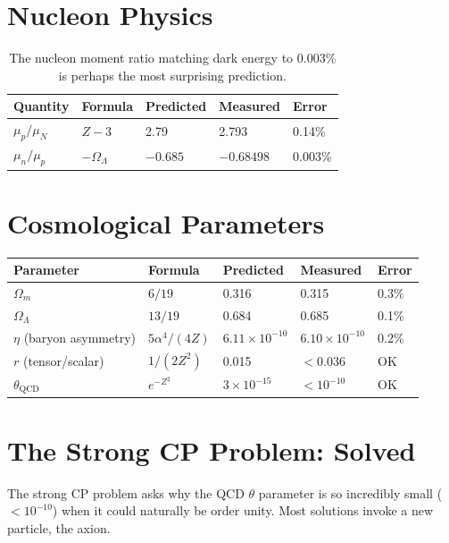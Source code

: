 \documentclass[11pt,a4paper]{article}
\theoremstyle{plain}
\theoremstyle{definition}
\theoremstyle{remark}
\newcommand{\Omegam}{\Omega_m}
\newcommand{\OmegaL}{\Omega_\Lambda}
\begin{document}
\section{Nucleon Physics}

\begin{table}[h!]
\centering
\begin{tabular}{lllll}
\toprule
\textbf{Quantity} & \textbf{Formula} & \textbf{Predicted} & \textbf{Measured} & \textbf{Error} \\
\midrule
$\mu_p/\mu_N$ & $Z - 3$ & 2.79 & 2.793 & 0.14\% \\
$\mu_n/\mu_p$ & $-\OmegaL$ & $-0.685$ & $-0.68498$ & 0.003\% \\
\bottomrule
\end{tabular}
\caption{The nucleon moment ratio matching dark energy to 0.003\% is perhaps the most surprising prediction.}
\end{table}

\section{Cosmological Parameters}

\begin{table}[h!]
\centering
\begin{tabular}{lllll}
\toprule
\textbf{Parameter} & \textbf{Formula} & \textbf{Predicted} & \textbf{Measured} & \textbf{Error} \\
\midrule
$\Omegam$ & $6/19$ & 0.316 & 0.315 & 0.3\% \\
$\OmegaL$ & $13/19$ & 0.684 & 0.685 & 0.1\% \\
$\eta$ (baryon asymmetry) & $5\alpha^4/(4Z)$ & $6.11 \times 10^{-10}$ & $6.10 \times 10^{-10}$ & 0.2\% \\
$r$ (tensor/scalar) & $1/(2Z^2)$ & 0.015 & $<0.036$ & OK \\
$\theta_{\text{QCD}}$ & $e^{-Z^2}$ & $3 \times 10^{-15}$ & $<10^{-10}$ & OK \\
\bottomrule
\end{tabular}
\end{table}

\section{The Strong CP Problem: Solved}

The strong CP problem asks why the QCD $\theta$ parameter is so incredibly small ($<10^{-10}$) when it could naturally be order unity. Most solutions invoke a new particle, the axion.
\end{document}
